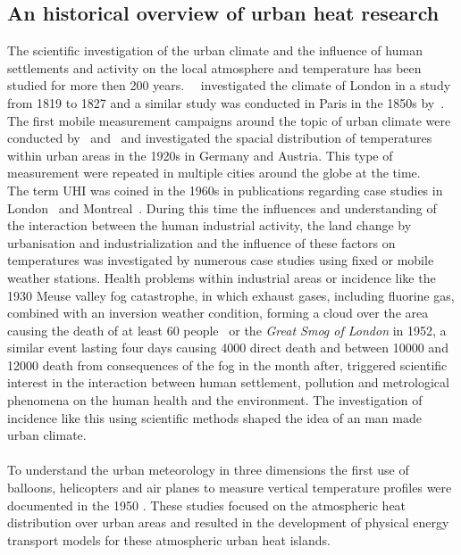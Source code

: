 \documentclass[12pt,a4paper, english,twoside]{scrartcl}
\begin{document}
 \subsection{An historical overview of urban heat research}
  The scientific investigation of the urban climate and the influence of human settlements and activity on the local atmosphere and temperature has been studied for more then 200 years.~%
  \cite{Howard1833}~investigated the climate of London in a study from 1819 to 1827 and a similar study was conducted in Paris in the 1850s by~\cite{renou1862differences}.~%
  The first mobile measurement campaigns around the topic of urban climate were conducted by~\cite{peppler1929auto} and~\cite{tollner1932untersuchungen} and investigated the spacial distribution of temperatures within urban areas  in the 1920s in Germany and Austria. 
  This type of measurement were repeated in multiple cities around the globe at the time.\\
  The term \gls{UHI} was coined in the 1960s in publications regarding case studies in London~\autocite{Chandler1961} and Montreal~\autocite{Oke1968}.
  During this time the influences and understanding of the interaction between the human industrial activity, the land change by urbanisation and industrialization and the influence of these factors on temperatures was investigated by numerous case studies using fixed or mobile weather stations.
  Health problems within industrial areas or incidence like the 1930 Meuse valley fog catastrophe, in which exhaust gases, including fluorine gas, combined with an inversion weather condition, forming a cloud over the area causing the death of at least 60 people~\autocite{Nemery2001} or 
  the \textit{Great Smog of London} in 1952, a similar event lasting four days causing 4000 direct death and between 10000 and 12000 death from consequences of the fog in the month after\autocite{Bell2004}, triggered scientific interest in the interaction between human settlement, pollution and metrological phenomena on the human health and the environment. 
  The investigation of incidence like this using scientific methods shaped the idea of an man made urban climate.\\ \\ 
%
  To understand the urban meteorology in three dimensions the first use of balloons, helicopters and air planes to measure vertical temperature profiles were documented in the 1950 \autocite{Duckworth1954}.
  These studies focused on the atmospheric heat distribution over urban areas and resulted in the development of physical energy transport models for these atmospheric urban heat islands.
\end{document}
